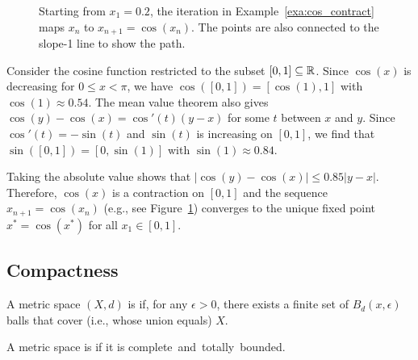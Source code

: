 \begin{figure}[t]
\centering

\vspace{-5mm}
\caption{\label{fig:cos_contract}Starting from $x_1 = 0.2$, the iteration in Example~\ref{exa:cos_contract} maps $x_n$ to $x_{n+1}= \cos(x_n)$.  The points are also connected to the slope-1 line to show the path.}
\end{figure}

\begin{example} \label{exa:cos_contract}
Consider the cosine function restricted to the subset $[0,1]\subseteq \mathbb{R}$.
Since $\cos(x)$ is decreasing for $0 \leq x < \pi$, we have $\cos([0,1]) = [\cos(1),1]$ with $\cos(1) \approx 0.54$.
The mean value theorem also gives $\cos(y)-\cos(x)=\cos'(t)(y-x)$ for some $t$ between $x$ and $y$.
Since $\cos '(t) = -\sin(t)$ and $\sin(t)$ is increasing on $[0,1]$, we find that $\sin([0,1]) = [0,\sin(1)]$ with $\sin(1) \approx 0.84$.

Taking the absolute value shows that $| \cos(y) - \cos(x) | \leq 0.85 |y-x|$.
Therefore, $\cos(x)$ is a contraction on $[0,1]$ and the sequence $x_{n+1} = \cos(x_n)$ (e.g., see Figure~\ref{fig:cos_contract}) converges to the unique fixed point $x^* = \cos(x^*)$ for all $x_1 \in [0,1]$.
\end{example}



\subsection{Compactness}
\label{sec:metspace_compact}

\begin{definition}
A metric space $(X,d)$ is  if, for any $\epsilon > 0$, there exists a finite set of $B_d (x,\epsilon)$ balls that cover (i.e., whose union equals) $X$.
\end{definition}

\begin{definition} \label{definition:metric_compact}
A metric space is  if it is complete~and~totally~bounded.
\end{definition}

